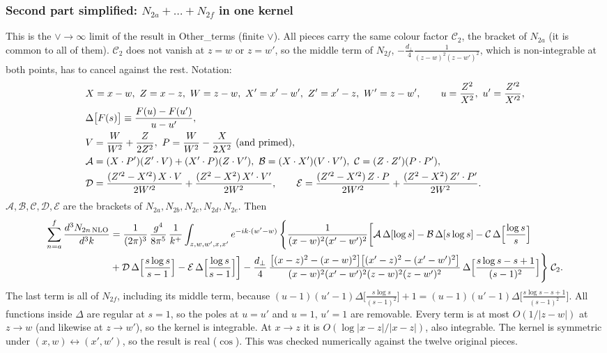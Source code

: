 \documentclass[9pt]{article}
\numberwithin{equation}{section}
\begin{document}
\subsubsection*{{\color{red}Second part simplified: $N_{2a}+\dots+N_{2f}$ in one kernel}}
{\color{red}This is the $\vee\to\infty$ limit of the result in Other\_terms (finite $\vee$). All pieces carry the same colour factor $\mathcal C_{2}$, the bracket of $N_{2a}$ (it is common to all of them). $\mathcal C_{2}$ does not vanish at $z=w$ or $z=w'$, so the middle term of $N_{2f}$, $-\frac{d_{\perp}}{4}\frac{1}{(z-w)^{2}(z-w')^{2}}$, which is non-integrable at both points, has to cancel against the rest. Notation:
\begin{align}
&X=x-w,\ Z=x-z,\ W=z-w,\ X'=x'-w',\ Z'=x'-z,\ W'=z-w',\qquad u=\frac{Z^{2}}{X^{2}},\ u'=\frac{Z'^{2}}{X'^{2}},\notag\\
&\Delta\big[F(s)\big]\equiv\frac{F(u)-F(u')}{u-u'},\notag\\
&V=\frac{W}{W^{2}}+\frac{Z}{2Z^{2}},\ P=\frac{W}{W^{2}}-\frac{X}{2X^{2}}\ (\text{and primed}),\notag\\
&\mathcal A=(X\cdot P')(Z'\cdot V)+(X'\cdot P)(Z\cdot V'),\ \mathcal B=(X\cdot X')(V\cdot V'),\ \mathcal C=(Z\cdot Z')(P\cdot P'),\notag\\
&\mathcal D=\frac{(Z'^{2}-X'^{2})\,X\cdot V}{2W'^{2}}+\frac{(Z^{2}-X^{2})\,X'\cdot V'}{2W^{2}},\qquad
\mathcal E=\frac{(Z'^{2}-X'^{2})\,Z\cdot P}{2W'^{2}}+\frac{(Z^{2}-X^{2})\,Z'\cdot P'}{2W^{2}}.
\end{align}
$\mathcal A,\mathcal B,\mathcal C,\mathcal D,\mathcal E$ are the brackets of $N_{2a},N_{2b},N_{2c},N_{2d},N_{2e}$. Then
\begin{align}
\sum_{n=a}^{f}\frac{d^{3}N_{2n\,\rm NLO}}{d^{3}k}&=\frac{1}{(2\pi)^{3}}\,\frac{g^{4}}{8\pi^{5}}\,\frac{1}{k^{+}}\int_{z,w,w',x,x'}e^{-ik\cdot(w'-w)}\,\Bigg\{\frac{1}{(x-w)^{2}(x'-w')^{2}}\bigg[\mathcal A\,\Delta[\log s]-\mathcal B\,\Delta[s\log s]-\mathcal C\,\Delta\Big[\frac{\log s}{s}\Big]\notag\\
&+\mathcal D\,\Delta\Big[\frac{s\log s}{s-1}\Big]-\mathcal E\,\Delta\Big[\frac{\log s}{s-1}\Big]\bigg]
-\frac{d_{\perp}}{4}\,\frac{\big[(x-z)^{2}-(x-w)^{2}\big]\big[(x'-z)^{2}-(x'-w')^{2}\big]}{(x-w)^{2}(x'-w')^{2}(z-w)^{2}(z-w')^{2}}\,\Delta\Big[\frac{s\log s-s+1}{(s-1)^{2}}\Big]\Bigg\}\;\mathcal C_{2}.
\end{align}
The last term is all of $N_{2f}$, including its middle term, because $(u-1)(u'-1)\Delta\big[\frac{s\log s}{(s-1)^{2}}\big]+1=(u-1)(u'-1)\Delta\big[\frac{s\log s-s+1}{(s-1)^{2}}\big]$. All functions inside $\Delta$ are regular at $s=1$, so the poles at $u=u'$ and $u=1$, $u'=1$ are removable. Every term is at most $O(1/|z-w|)$ at $z\to w$ (and likewise at $z\to w'$), so the kernel is integrable. At $x\to z$ it is $O(\log|x-z|/|x-z|)$, also integrable. The kernel is symmetric under $(x,w)\leftrightarrow(x',w')$, so the result is real ($\cos$). This was checked numerically against the twelve original pieces.}
\end{document}
